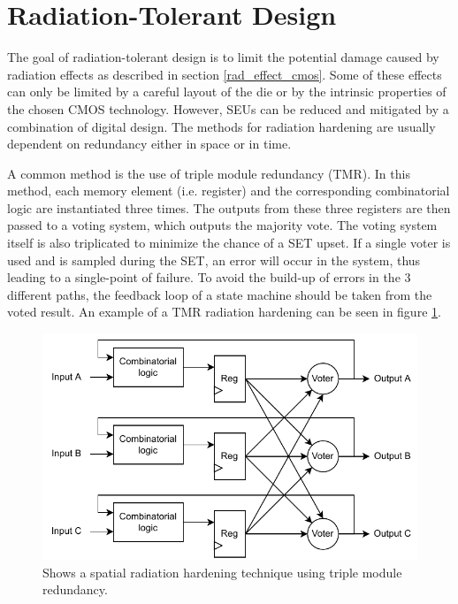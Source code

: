 \section{Radiation-Tolerant Design}
\label{rt_design}
The goal of radiation-tolerant design is to limit the potential damage caused by radiation effects as described in section \ref{rad_effect_cmos}. Some of these effects can only be limited by a careful layout of the die or by the intrinsic properties of the chosen CMOS technology. However, SEUs can be reduced and mitigated by a combination of digital design. The methods for radiation hardening are usually dependent on redundancy either in space or in time. 

A common method is the use of triple module redundancy (TMR). In this method, each memory element (i.e. register) and the corresponding combinatorial logic are instantiated three times. The outputs from these three registers are then passed to a voting system, which outputs the majority vote. The voting system itself is also triplicated to minimize the chance of a SET upset. If a single voter is used and is sampled during the SET, an error will occur in the system, thus leading to a single-point of failure. To avoid the build-up of errors in the 3 different paths, the feedback loop of a state machine should be taken from the voted result. An example of a TMR radiation hardening can be seen in figure \ref{fig:spatial_triplication}.

\begin{figure}[H]
    \centering
    \includegraphics[width=0.7\linewidth]{subfiles/imgs/spacialTriplication.drawio (1).pdf}
    \caption{Shows a spatial radiation hardening technique using triple module redundancy.}
    \label{fig:spatial_triplication}
\end{figure}

